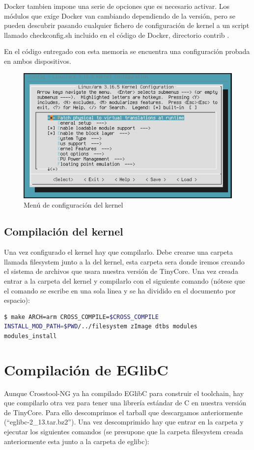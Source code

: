 \documentclass{tfg}
\begin{document}
Docker tambien impone una serie de opciones que es necesario activar. Los módulos que exige Docker van cambiando dependiendo de la versión, pero se pueden descubrir pasando cualquier fichero de configuración de kernel a un script llamado checkconfig.sh incluido en el código de Docker, directorio contrib \cite{dockercheckconfig}.

En el código entregado con esta memoria se encuentra una configuración probada en ambos dispositivos.

\begin{figure}[hb]
	\centering
	\includegraphics[scale=0.8]{images/kernel_menu}
	\caption{Menú de configuración del kernel}
\end{figure}

\subsection{Compilación del kernel}
Una vez configurado el kernel hay que compilarlo. Debe crearse una carpeta llamada filesystem junto a la del kernel,
esta carpeta sera donde iremos creando el sistema de archivos que usara nuestra versión de TinyCore. Una vez creada
entrar a la carpeta del kernel y compilarlo con el siguiente comando (nótese que el comando se escribe en una sola
linea y se ha dividido en el documento por espacio):

\begin{lstlisting}[language=bash,caption=Compilacion del kernel]
$ make ARCH=arm CROSS_COMPILE=$CROSS_COMPILE
INSTALL_MOD_PATH=$PWD/../filesystem zImage dtbs modules
modules_install
\end{lstlisting}
%

\section{Compilación de EGlibC}
Aunque Crosstool-NG ya ha compilado EGlibC para construir el toolchain, hay que compilarlo otra vez para
tener una librería estándar de C en nuestra versión de TinyCore. Para ello descomprimos el tarball que descargamos
anteriormente (``eglibc-2\_13.tar.bz2''). Una vez descomprimido hay que entrar en la carpeta y ejecutar los siguientes
comandos (se presupone que la carpeta filesystem creada anteriormente esta junto a la carpeta de eglibc):
\end{document}
